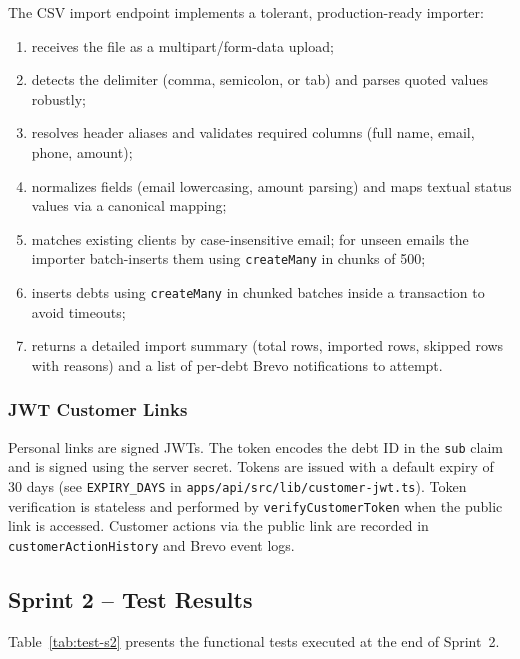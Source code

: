 \documentclass[12pt,a4paper]{report}
\begin{document}
The CSV import endpoint implements a tolerant, production-ready importer:
\begin{enumerate}
  \item receives the file as a multipart/form-data upload;
  \item detects the delimiter (comma, semicolon, or tab) and parses quoted values
        robustly;
  \item resolves header aliases and validates required columns (full name, email,
        phone, amount);
  \item normalizes fields (email lowercasing, amount parsing) and maps textual status
        values via a canonical mapping;
  \item matches existing clients by case-insensitive email; for unseen emails the
        importer batch-inserts them using \texttt{createMany} in chunks of 500;
  \item inserts debts using \texttt{createMany} in chunked batches inside a
        transaction to avoid timeouts;
  \item returns a detailed import summary (total rows, imported rows, skipped rows
        with reasons) and a list of per-debt Brevo notifications to attempt.
\end{enumerate}

\subsubsection{JWT Customer Links}

Personal links are signed JWTs.
The token encodes the debt ID in the \texttt{sub} claim and is signed using the server
secret.
Tokens are issued with a default expiry of 30 days (see \texttt{EXPIRY\_DAYS} in
\texttt{apps/api/src/lib/customer-jwt.ts}).
Token verification is stateless and performed by \texttt{verifyCustomerToken} when the
public link is accessed.
Customer actions via the public link are recorded in \texttt{customerActionHistory} and
Brevo event logs.

\FloatBarrier

\subsection{Sprint 2 -- Test Results}

Table~\ref{tab:test-s2} presents the functional tests executed at the end of Sprint~2.
\end{document}
